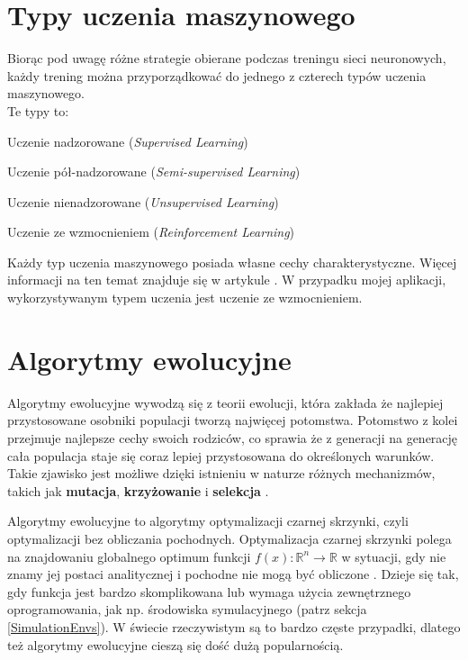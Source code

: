 \section{Typy uczenia maszynowego}
Biorąc pod uwagę różne strategie obierane podczas treningu sieci neuronowych, każdy trening można przyporządkować do jednego z czterech typów uczenia maszynowego. \\
Te typy to:
\begin{enumerate*}
\item Uczenie nadzorowane (\textit{Supervised Learning})
\item Uczenie pół-nadzorowane (\textit{Semi-supervised Learning})
\item Uczenie nienadzorowane (\textit{Unsupervised Learning})
\item Uczenie ze wzmocnieniem (\textit{Reinforcement Learning})
\end{enumerate*}
Każdy typ uczenia maszynowego posiada własne cechy charakterystyczne. Więcej informacji na ten temat znajduje się w artykule \cite{mlTypes:overview}. W przypadku mojej aplikacji, wykorzystywanym typem uczenia jest uczenie ze wzmocnieniem.

\section{Algorytmy ewolucyjne}
Algorytmy ewolucyjne wywodzą się z teorii ewolucji, która zakłada że najlepiej przystosowane osobniki populacji tworzą najwięcej potomstwa. Potomstwo z kolei przejmuje najlepsze cechy swoich rodziców, co sprawia że z generacji na generację cała populacja staje się coraz lepiej przystosowana do określonych warunków. Takie zjawisko jest możliwe dzięki istnieniu w naturze różnych mechanizmów, takich jak \textbf{mutacja}, \textbf{krzyżowanie} i \textbf{selekcja} \cite{de:tutorial}.

Algorytmy ewolucyjne to algorytmy optymalizacji czarnej skrzynki, czyli optymalizacji bez obliczania pochodnych. Optymalizacja czarnej skrzynki polega na znajdowaniu globalnego optimum funkcji $ f(x): \mathbb{R}^n \rightarrow \mathbb{R} $ w sytuacji, gdy nie znamy jej postaci analitycznej i pochodne nie mogą być obliczone \cite{de:tutorial}. Dzieje się tak, gdy funkcja jest bardzo skomplikowana lub wymaga użycia zewnętrznego oprogramowania, jak np. środowiska symulacyjnego (patrz sekcja \ref{SimulationEnvs}). W świecie rzeczywistym są to bardzo częste przypadki, dlatego też algorytmy ewolucyjne cieszą się dość dużą popularnością.

